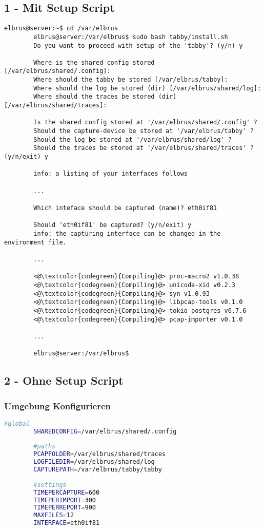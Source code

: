 	\subsection{1 - Mit Setup Script}
	
	\lstset{style=commands}
	\begin{lstlisting}[caption={Ausführen des 'install.sh' Scripts.}]
		elbrus@server:~$ cd /var/elbrus
		elbrus@server:/var/elbrus$ sudo bash tabby/install.sh
		Do you want to proceed with setup of the 'tabby'? (y/n) y
		
		Where is the shared config stored [/var/elbrus/shared/.config]:
		Where should the tabby be stored [/var/elbrus/tabby]:
		Where should the log be stored (dir) [/var/elbrus/shared/log]:
		Where should the traces be stored (dir) [/var/elbrus/shared/traces]:
		
		Is the shared config stored at '/var/elbrus/shared/.config' ?
		Should the capture-device be stored at '/var/elbrus/tabby' ?
		Should the log be stored at '/var/elbrus/shared/log' ?
		Should the traces be stored at '/var/elbrus/shared/traces' ? (y/n/exit) y
		
		info: a listing of your interfaces follows
		
		...
		
		Which inteface should be captured (name)? eth0if81
		
		Should 'eth0if81' be captured? (y/n/exit) y
		info: the capturing interface can be changed in the environment file.
		
		...
		
		<@\textcolor{codegreen}{Compiling}@> proc-macro2 v1.0.38
		<@\textcolor{codegreen}{Compiling}@> unicode-xid v0.2.3
		<@\textcolor{codegreen}{Compiling}@> syn v1.0.93
		<@\textcolor{codegreen}{Compiling}@> libpcap-tools v0.1.0
		<@\textcolor{codegreen}{Compiling}@> tokio-postgres v0.7.6
		<@\textcolor{codegreen}{Compiling}@> pcap-importer v0.1.0
		
		...
		
		elbrus@server:/var/elbrus$
	\end{lstlisting}
	\newpage
	
	\subsection{2 - Ohne Setup Script}
	\subsubsection[file config]{Umgebung Konfigurieren}
	\lstset{style=files}
	\begin{lstlisting}[caption={Anhand von '.env.example' eigene '.env' Datei anlegen.}, language=bash]
		#global
		SHAREDCONFIG=/var/elbrus/shared/.config
		
		#paths
		PCAPFOLDER=/var/elbrus/shared/traces
		LOGFILEDIR=/var/elbrus/shared/log
		CAPTUREPATH=/var/elbrus/tabby/tabby
		
		#settings
		TIMEPERCAPTURE=600
		TIMEPERIMPORT=300
		TIMEPERREPORT=900
		MAXFILES=12
		INTERFACE=eth0if81
	\end{lstlisting}
	
